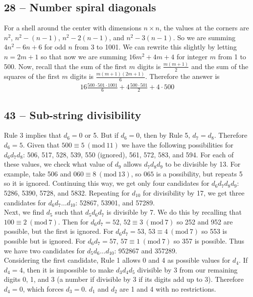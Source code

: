 \documentclass{article}
\newcommand{\Mod}[1]{\ (\mathrm{mod}\ #1)}
\begin{document}
\subsection*{28 -- Number spiral diagonals} 
For a shell around the center with dimensions $n \times n$, the values at the corners are $n^2$, $n^2 - (n-1)$, $n^2 - 2(n-1)$, and $n^2 - 3(n-1)$. 
So we are summing $4n^2 - 6n + 6$ for odd $n$ from 3 to 1001. 
We can rewrite this slightly by letting $n = 2m+1$ so that now we are summing $16m^2 + 4m + 4$ for integer $m$ from 1 to 500. 
Now, recall that the sum of the first $m$ digits is $\frac{m(m+1)}{2}$ and the sum of the squares of the first $m$ digits is $\frac{m(m+1)(2m+1)}{6}$. 
Therefore the answer is 
\begin{align*}
	\boxed{ 16 \frac{500 \cdot 501 \cdot 1001}{6} + 4 \frac{500 \cdot 501}{2} + 4 \cdot 500 }
\end{align*}


\subsection*{43 -- Sub-string divisibility} 
Rule 3 implies that $d_6 = 0$ or 5. 
But if $d_6=0$, then by Rule 5, $d_7=d_8$. 
Therefore $d_6 = 5$. 
Given that $500 \equiv 5 \Mod{11}$ we have the following possibilities for $d_6d_7d_8$: 506, 517, 528, 539, 550 (ignored), 561, 572, 583, and 594. 
For each of these values, we check what value of $d_9$ allows $d_7d_8d_9$ to be divisible by 13. 
For example, take 506 and $060 \equiv 8 \Mod{13}$, so $065$ is a possibility, but repeats 5 so it is ignored. 
Continuing this way, we get only four candidates for $d_6d_7d_8d_9$: 5286, 5390, 5728, and 5832. 
Repeating for $d_{10}$ for divisibility by 17, we get three candidates for $d_6d_7\dotsc d_{10}$: 52867, 53901, and 57289. \\

Next, we find $d_5$ such that $d_5d_6d_7$ is divisible by 7. 
We do this by recalling that $100 \equiv 2 \Mod{7}$. 
Then for $d_6d_7 = 52$, $52 \equiv 3 \Mod{7}$ so 252 and 952 are possible, but the first is ignored. 
For $d_6d_7 = 53$, $53 \equiv 4 \Mod{7}$ so 553 is possible but is ignored. 
For $d_6d_7=57$, $57 \equiv 1 \Mod{7}$ so 357 is possible. 
Thus we have two candidates for $d_5d_6\dotsc d_{10}$: 952867 and 357289. \\

Considering the first candidate, Rule 1 allows 0 and 4 as possible values for $d_4$. 
If $d_4 = 4$, then it is impossible to make $d_3d_4d_5$ divisible by 3 from our remaining digits 0, 1, and 3 (a number if divisible by 3 if its digits add up to 3). 
Therefore $d_4 = 0$, which forces $d_3=0$. 
$d_1$ and $d_2$ are 1 and 4 with no restrictions. \\
\end{document}

